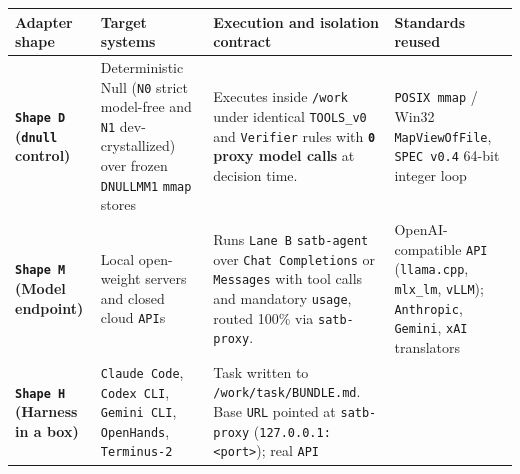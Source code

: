\documentclass[10pt,letterpaper]{article}
\begin{document}
{\footnotesize\setlength{\tabcolsep}{3.8pt}\renewcommand{\arraystretch}{1.15}
\begin{longtable}[]{@{}
  >{\raggedright\arraybackslash}p{}
  >{\raggedright\arraybackslash}p{}
  >{\raggedright\arraybackslash}p{}
  >{\raggedright\arraybackslash}p{}@{}}
\toprule\noalign{}
\begin{minipage}[b]{\linewidth}\raggedright
\textbf{Adapter shape}
\end{minipage} & \begin{minipage}[b]{\linewidth}\raggedright
\textbf{Target systems}
\end{minipage} & \begin{minipage}[b]{\linewidth}\raggedright
\textbf{Execution and isolation contract}
\end{minipage} & \begin{minipage}[b]{\linewidth}\raggedright
\textbf{Standards reused}
\end{minipage} \\
\midrule\noalign{}
\endhead
\bottomrule\noalign{}
\endlastfoot
\textbf{\texttt{Shape\ D} (\texttt{dnull} control)} & Deterministic Null
(\texttt{N0} strict model-free and \texttt{N1} dev-crystallized) over
frozen \texttt{DNULLMM1} \texttt{mmap} stores & Executes inside
\texttt{/work} under identical \texttt{TOOLS\_v0} and \texttt{Verifier}
rules with \textbf{\texttt{0} proxy model calls} at decision time. &
\texttt{POSIX\ mmap} / Win32 \texttt{MapViewOfFile}, \texttt{SPEC\ v0.\allowbreak{}4}
64-bit integer loop \\
\textbf{\texttt{Shape\ M} (Model endpoint)} & Local open-weight servers
and closed cloud \texttt{API}s & Runs \texttt{Lane\ B}
\texttt{satb-\allowbreak{}agent} over \texttt{Chat\ Completions} or \texttt{Messages}
with tool calls and mandatory \texttt{usage}, routed 100\% via
\texttt{satb-\allowbreak{}proxy}. & OpenAI-compatible \texttt{API}
(\texttt{llama.cpp}, \texttt{mlx\_lm}, \texttt{vLLM});
\texttt{Anthropic}, \texttt{Gemini}, \texttt{xAI} translators \\
\textbf{\texttt{Shape\ H} (Harness in a box)} & \texttt{Claude\ Code},
\texttt{Codex\ CLI}, \texttt{Gemini\ CLI}, \texttt{OpenHands},
\texttt{Terminus-\allowbreak{}2} & Task written to \texttt{/\allowbreak{}work/\allowbreak{}task/\allowbreak{}BUNDLE.\allowbreak{}md}.
Base \texttt{URL} pointed at \texttt{satb-\allowbreak{}proxy}
(\texttt{127.0.0.1:\textless{}port\textgreater{}}); real \texttt{API}

\end{longtable}}
\end{document}
